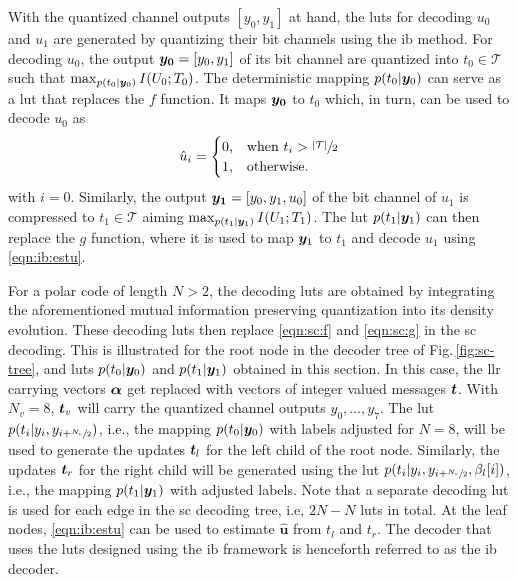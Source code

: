 With the quantized channel outputs $[y_0,y_1]$ at hand, the \glspl{lut} for decoding $u_0$ and $u_1$ are generated by quantizing their bit channels  using the \gls{ib} method. For decoding $u_0$, the output $\bm{y_0}=[y_0,y_1]$ of its bit channel are quantized into $t_0\in\mathcal{T}$ such that $\max_{p(t_0|\bm{y}_0)}I(U_0;T_0)$. The deterministic mapping $p(t_0|\bm{y}_0)$ can serve as a \gls{lut} that replaces the $f$ function. It maps $\bm{y_0}$ to $t_0$ which, in turn, can be used to decode $u_0$ as 
\begin{align}\label{eqn:ib:estu}
\hat{u}_i = \begin{cases}
0\text{,} & \text{when } t_i >\sfrac{|\mathcal{T}|}{2}\\
1\text{,} & \text{otherwise.}
\end{cases}
\end{align}
with $i = 0$. 
Similarly, the output $\bm{y_1}=[y_0,y_1,u_0]$ of the bit channel of $u_1$ is compressed to $t_1 \in \mathcal{T}$   aiming $\max_{p(t_1|\bm{y}_1)}I(U_1;T_1)$. The \gls{lut} $p(t_1|\bm{y}_1)$ can then replace the $g$ function, where it is used to map $\bm{y}_1$ to $t_1$ and decode $u_1$ using \eqref{eqn:ib:estu}. 

For a polar code of length $N > 2$, the decoding \glspl{lut} are obtained by integrating the aforementioned mutual information preserving quantization into its density evolution\cite{shah_coarsely_2019}. These decoding \glspl{lut} then replace \eqref{eqn:sc:f} and \eqref{eqn:sc:g} in the \gls{sc} decoding.
This is illustrated for the root node in the decoder tree of Fig.\,\ref{fig:sc-tree}, and \glspl{lut} $p(t_0|\bm{y}_0)$ and $p(t_1|\bm{y}_1)$ obtained in this section. In this case, the \gls{llr} carrying vectors $\bm{\alpha}$ get replaced with vectors of integer valued messages $\bm{t}$. With $N_v{=}8$, $\bm{t}_v$ will carry the  quantized channel outputs $y_0,\dots,y_7$. The \gls{lut} $p(t_i| y_i,y_{i + \sfrac{N_v}{2}})$, i.e., the mapping $p(t_0|\bm{y}_0)$ with labels adjusted for $N{=}8$, will be used to generate the updates $\bm{t}_l$ for the left child of the root node. Similarly, the updates $\bm{t}_r$ for the right child will be generated using the \gls{lut}  $p(t_i| y_i,y_{i + \sfrac{N_v}{2}},\beta_l[i])$, i.e., the mapping $p(t_1|\bm{y}_1)$ with adjusted labels. Note that  a separate decoding \gls{lut} is used for each edge in the \gls{sc} decoding tree, i.e, $2N{-}N$ \glspl{lut} in total. At the leaf nodes, \eqref{eqn:ib:estu} can be used to estimate $\bm{\hat{u}}$ from $t_l$ and $t_r$.  The decoder that uses the \glspl{lut} designed using the \gls{ib} framework is henceforth referred to as the \gls{ib} decoder.



